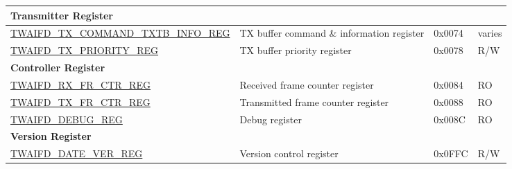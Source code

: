 \begin{longtable}{ | p{6cm} | p{7.2cm} | p{1.3cm} | p{1.5cm} | }
\multicolumn{4}{|l|}{\textbf{Transmitter Register}} \\ \hline
\hyperref[regdesc:TWAIFDTXCOMMANDTXTBINFOREG]{TWAIFD\_TX\_COMMAND\_TXTB\_INFO\newline \_REG} & TX buffer command \& information register & 0x0074 & varies \\ \hline
\hyperref[regdesc:TWAIFDTXPRIORITYREG]{TWAIFD\_TX\_PRIORITY\_REG} & TX buffer priority register & 0x0078 & R/W \\ \hline
\multicolumn{4}{|l|}{\textbf{Controller Register}} \\ \hline
\hyperref[regdesc:TWAIFDRXFRCTRREG]{TWAIFD\_RX\_FR\_CTR\_REG} & Received frame counter register & 0x0084 & RO \\ \hline
\hyperref[regdesc:TWAIFDTXFRCTRREG]{TWAIFD\_TX\_FR\_CTR\_REG} & Transmitted frame counter register & 0x0088 & RO \\ \hline
\hyperref[regdesc:TWAIFDDEBUGREG]{TWAIFD\_DEBUG\_REG} & Debug register & 0x008C & RO \\ \hline
\multicolumn{4}{|l|}{\textbf{Version Register}} \\ \hline
\hyperref[regdesc:TWAIFDDATEVERREG]{TWAIFD\_DATE\_VER\_REG} & Version control register & 0x0FFC & R/W \\ \hline
\end{longtable}
